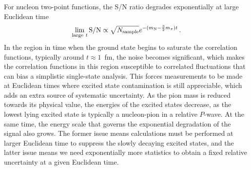 \documentclass{ar-1col}
\begin{document}
For nucleon two-point functions, the S/N ratio degrades exponentially at large Euclidean time~\cite{Lepage:1989hd}
\begin{equation}
\lim_{{\rm large}\ t} {\rm S/N}
    \propto \sqrt{N_{\mathrm{sample}}} e^{-(m_{\mathrm{N}} - \frac{3}{2}m_\pi)t}\, .
\end{equation}
In the region in time when the ground state begins to saturate the correlation functions, typically around $t\approx 1$~fm, the noise becomes significant, which makes the correlation functions in this region susceptible to correlated fluctuations that can bias a simplistic single-state analysis.
This forces measurements to be made at Euclidean times where
 excited state contamination is still appreciable,
 which adds an extra source of systematic uncertainty.
As the pion mass is reduced towards its physical value, the energies of the excited states decrease, as the lowest lying excited state is typically a nucleon-pion in a relative $P$-wave.
At the same time, the energy scale that governs the exponential degradation of the signal also grows.
The former issue means calculations must be performed at larger Euclidean time to suppress the slowly decaying excited states, and the latter issue means we need exponentially more statistics to obtain a fixed relative uncertainty at a given Euclidean time.
\end{document}
